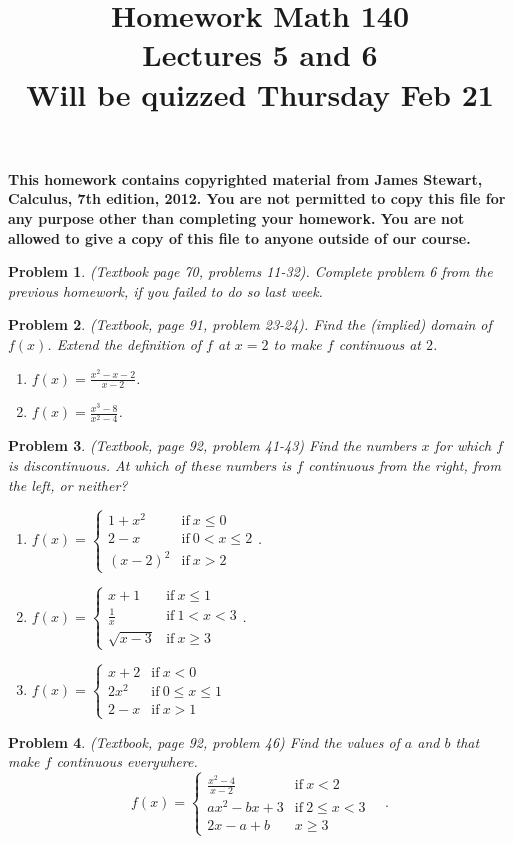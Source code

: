 \documentclass{article}
\date{}
\title{
Homework Math 140 \\
Lectures 5 and 6 \\
Will be quizzed Thursday Feb 21
}
\newcommand{\triplebrace}[6]{\left\{\begin{array}{ll} #1 & #2 \\#3 & #4  \\#5 & #6\end{array} \right.}
\newtheorem{problem}{Problem}
\begin{document}
\maketitle
\textbf{This homework contains copyrighted material from  James Stewart, Calculus, 7th edition, 2012. 
You are not permitted to copy this file for any purpose other than completing your homework. You are not allowed to give a copy of this file to anyone outside of our course. 
}

\begin{problem}(Textbook page 70, problems 11-32). Complete problem 6 from the previous homework, if you failed to do so last week.
\end{problem}
\begin{problem}
(Textbook, page 91, problem 23-24). Find the (implied) domain of $f(x)$. Extend the definition of $f$ at $x=2$ to make $f$ continuous at $2$.
\begin{multicols}{2}
\begin{enumerate}
\item $f(x)=\frac{x^2-x-2}{x-2}$.
\item $f(x)=\frac{x^3-8}{x^2-4}$.
\end{enumerate}
\end{multicols}
\end{problem}
\begin{problem}(Textbook, page 92, problem 41-43)
Find the numbers $x$ for which $f$ is discontinuous. At which of these numbers is $f$ continuous from the right, from the left, or neither? 
\begin{multicols}{2}
\begin{enumerate}
\item $f(x)=\triplebrace{1+x^2}{\mathrm{if~} x\leq 0 } {2-x}{\mathrm{if~} 0<x\leq 2}{(x-2)^2}{\mathrm{if~} x>2}$.
\item $f(x)=\triplebrace{x+1}{\mathrm{if~} x\leq 1 }{\frac{1}{x}}{\mathrm{if~}1<x<3}{\sqrt{x-3}}{\mathrm{if~} x\geq 3}$.
\item $f(x)=\triplebrace{x+2}{\mathrm{if~} x<0}{2x^2}{\mathrm{if~} 0\leq x\leq 1 }{2-x}{\mathrm{if~}x>1 }$
\end{enumerate}
\end{multicols}
\end{problem}
\begin{problem} (Textbook, page 92, problem 46)
Find the values of $a$ and $b$ that make $f$ continuous everywhere.
\[f(x)=\triplebrace{\frac{x^2-4}{x-2}}{\mathrm{if~}x<2}{ax^2-bx+3}{\mathrm{if~}2\leq x<3}{2x-a+b}{x\geq 3} \quad .\]
\end{problem}
\end{document}
